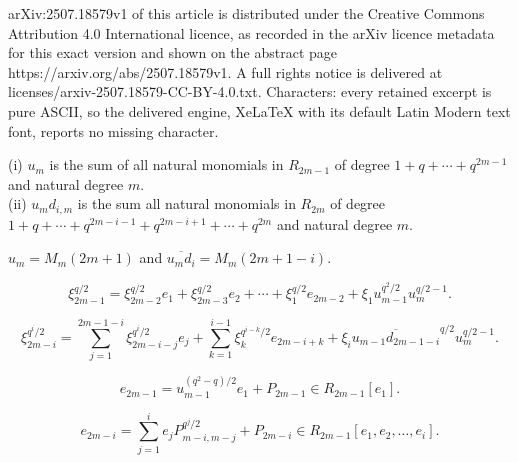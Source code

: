 \documentclass[10pt,a4paper]{amsart}
\begin{document}
arXiv:2507.18579v1 of this article is distributed under the Creative Commons Attribution 4.0 International licence, as recorded in the arXiv licence metadata for this exact version and shown on the abstract page https://arxiv.org/abs/2507.18579v1. A full rights notice is delivered at licenses/arxiv-2507.18579-CC-BY-4.0.txt. Characters: every retained excerpt is pure ASCII, so the delivered engine, XeLaTeX with its default Latin Modern text font, reports no missing character.
\begin{lemma} \label{nat_mon_lem} (i) $u_m$ is the sum of all natural monomials in $R_{2m-1}$ of degree $1+q+\cdots +q^{2m-1}$ and natural degree $m$.\\
(ii) $u_md_{i,m}$ is the sum all natural monomials in $R_{2m}$ of degree $1+q+\cdots +q^{2m-i-1}+q^{2m-i+1}+\cdots +q^{2m}$ and natural degree $m$.
\end{lemma}

\begin{theorem} \label{Oodd_det_thm} $u_m=M_m(2m+1)$ and $\overline{u_m d_i}=M_m(2m+1-i)$.
\end{theorem}

\begin{equation}\label{Oodd-eqn1}
\xi_{2m-1}^{q/2}=\xi_{2m-2}^{q/2}e_1+\xi_{2m-3}^{q/2}e_2+\cdots +\xi_{1}^{q/2}e_{2m-2}
+\xi_1u_{m-1}^{q^2/2}u_m^{q/2-1}.
\end{equation}

\begin{equation}\label{Oodd-eqni}
\xi_{2m-i}^{q^i/2}=\sum_{j=1}^{2m-1-i} \xi_{2m-i-j}^{q^i/2} e_j +\sum_{k=1}^{i-1} \xi_k^{q^{i-k}/2} e_{2m-i+k}
+\xi_i \overline{u_{m-1}d_{2m-1-i}}^{q/2} u_m^{q/2-1}.
\end{equation}

\begin{equation} \label{Oodd-exrel1}
e_{2m-1}=u_{m-1}^{(q^2-q)/2}e_1+P_{2m-1}\in R_{2m-1}[e_1].
\end{equation} 

\begin{equation} \label{Oodd-exrelgen}
e_{2m-i}=\sum_{j=1}^i e_jP_{m-i,m-j}^{q^j/2}+P_{2m-i}\in R_{2m-1}[e_1,e_2,\ldots,e_i].
\end{equation} 
\end{document}
